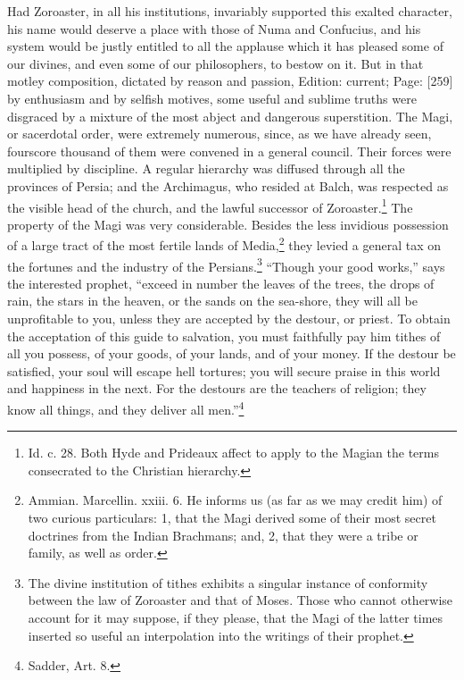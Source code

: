 Had Zoroaster, in all his institutions, invariably supported this exalted character, his name would deserve a place with those of Numa and Confucius, and his system would be justly entitled to all the applause which it has pleased some of our divines, and even some of our philosophers, to bestow on it. But in that motley composition, dictated by reason and passion, Edition: current; Page: [259] by enthusiasm and by selfish motives, some useful and sublime truths were disgraced by a mixture of the most abject and dangerous superstition. The Magi, or sacerdotal order, were extremely numerous, since, as we have already seen, fourscore thousand of them were convened in a general council. Their forces were multiplied by discipline. A regular hierarchy was diffused through all the provinces of Persia; and the Archimagus, who resided at Balch, was respected as the visible head of the church, and the lawful successor of Zoroaster.\footnote{Id. c. 28. Both Hyde and Prideaux affect to apply to the Magian the terms consecrated to the Christian hierarchy.} The property of the Magi was very considerable. Besides the less invidious possession of a large tract of the most fertile lands of Media,\footnote{Ammian. Marcellin. xxiii. 6. He informs us (as far as we may credit him) of two curious particulars: 1, that the Magi derived some of their most secret doctrines from the Indian Brachmans; and, 2, that they were a tribe or family, as well as order.} they levied a general tax on the fortunes and the industry of the Persians.\footnote{The divine institution of tithes exhibits a singular instance of conformity between the law of Zoroaster and that of Moses. Those who cannot otherwise account for it may suppose, if they please, that the Magi of the latter times inserted so useful an interpolation into the writings of their prophet.} \texthebrew{“}Though your good works,\texthebrew{}” says the interested prophet, \texthebrew{“}exceed in number the leaves of the trees, the drops of rain, the stars in the heaven, or the sands on the sea-shore, they will all be unprofitable to you, unless they are accepted by the destour, or priest. To obtain the acceptation of this guide to salvation, you must faithfully pay him tithes of all you possess, of your goods, of your lands, and of your money. If the destour be satisfied, your soul will escape hell tortures; you will secure praise in this world and happiness in the next. For the destours are the teachers of religion; they know all things, and they deliver all men.\texthebrew{}”\footnote{Sadder, Art. 8.}

